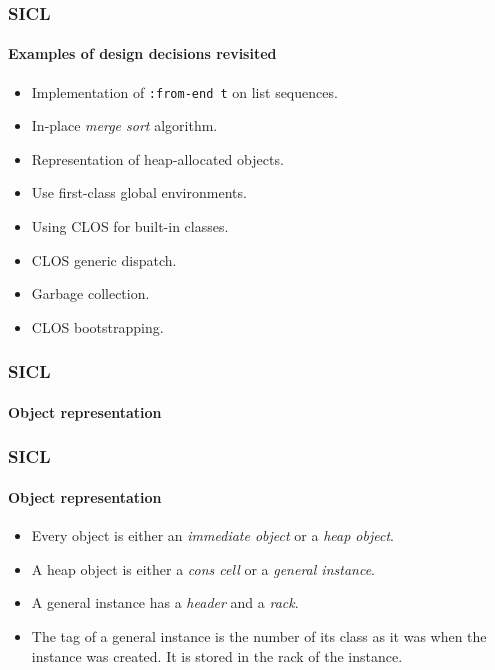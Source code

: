 \documentclass[12pt]{beamer}
\def\inputfig#1{}
\begin{document}
\begin{frame}
  \frametitle{SICL}
  \framesubtitle{Examples of design decisions revisited}

  \begin{itemize}
  \item Implementation of \texttt{:from-end t} on list sequences.
  \item In-place \emph{merge sort} algorithm. 
  \item Representation of heap-allocated objects.
  \item Use first-class global environments.
  \item Using CLOS for built-in classes.
  \item CLOS generic dispatch.
  \item Garbage collection.
  \item CLOS bootstrapping.
  \end{itemize}
\end{frame}
\begin{frame}
  \frametitle{SICL}
  \framesubtitle{Object representation}
  \begin{center}
\inputfig{fig-representation.pdf_t}
  \end{center}

\end{frame}
\begin{frame}
  \frametitle{SICL}
  \framesubtitle{Object representation}

  \begin{itemize}
  \item Every object is either an \emph{immediate object} or a
    \emph{heap object}.
  \item A heap object is either a \emph{cons cell} or a \emph{general
    instance}.
  \item A general instance has a \emph{header} and a \emph{rack}.
  \item The tag of a general instance is the number of its class as it
    was when the instance was created.  It is stored in the rack of
    the instance.
  \end{itemize}

\end{frame}
\end{document}
